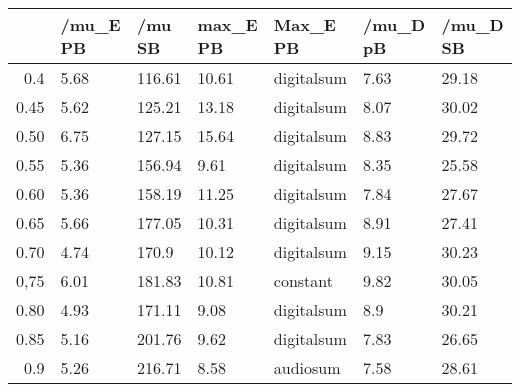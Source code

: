\begin{table}[ht]
\centering
\begin{tabular}{rllllll}
  \hline
 & /mu\_E PB & /mu SB & max\_E PB & Max\_E PB & /mu\_D pB & /mu\_D SB \\ 
  \hline
0.4 & 5.68 & 116.61 & 10.61 & digitalsum & 7.63 & 29.18 \\ 
  0.45 & 5.62 & 125.21 & 13.18 & digitalsum & 8.07 & 30.02 \\ 
  0.50 & 6.75 & 127.15 & 15.64 & digitalsum & 8.83 & 29.72 \\ 
  0.55 & 5.36 & 156.94 & 9.61 & digitalsum & 8.35 & 25.58 \\ 
  0.60 & 5.36 & 158.19 & 11.25 & digitalsum & 7.84 & 27.67 \\ 
  0.65 & 5.66 & 177.05 & 10.31 & digitalsum & 8.91 & 27.41 \\ 
  0.70 & 4.74 & 170.9 & 10.12 & digitalsum & 9.15 & 30.23 \\ 
  0,75 & 6.01 & 181.83 & 10.81 & constant & 9.82 & 30.05 \\ 
  0.80 & 4.93 & 171.11 & 9.08 & digitalsum & 8.9 & 30.21 \\ 
  0.85 & 5.16 & 201.76 & 9.62 & digitalsum & 7.83 & 26.65 \\ 
  0.9 & 5.26 & 216.71 & 8.58 & audiosum & 7.58 & 28.61 \\ 
   \hline
\end{tabular}
\end{table}
